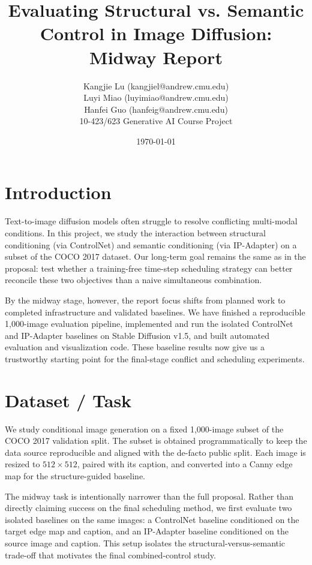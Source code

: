 \documentclass[twocolumn,11pt]{article}
\begin{document}
\title{Evaluating Structural vs. Semantic Control in Image Diffusion: Midway Report}
\author{Kangjie Lu (kangjiel@andrew.cmu.edu) \\
        Luyi Miao (luyimiao@andrew.cmu.edu) \\
        Hanfei Guo (hanfeig@andrew.cmu.edu)\\
10-423/623 Generative AI Course Project}
\date{\today}
\maketitle

\linenumbers

\section{Introduction}
Text-to-image diffusion models often struggle to resolve conflicting multi-modal conditions. In this project, we study the interaction between structural conditioning (via ControlNet) and semantic conditioning (via IP-Adapter) on a subset of the COCO 2017 dataset. Our long-term goal remains the same as in the proposal: test whether a training-free time-step scheduling strategy can better reconcile these two objectives than a naive simultaneous combination.

By the midway stage, however, the report focus shifts from planned work to completed infrastructure and validated baselines. We have finished a reproducible 1{,}000-image evaluation pipeline, implemented and run the isolated ControlNet and IP-Adapter baselines on Stable Diffusion v1.5, and built automated evaluation and visualization code. These baseline results now give us a trustworthy starting point for the final-stage conflict and scheduling experiments.

\section{Dataset / Task}

We study conditional image generation on a fixed 1{,}000-image subset of the COCO 2017 validation split. The subset is obtained programmatically to keep the data source reproducible and aligned with the de-facto public split. Each image is resized to $512 \times 512$, paired with its caption, and converted into a Canny edge map for the structure-guided baseline.

The midway task is intentionally narrower than the full proposal. Rather than directly claiming success on the final scheduling method, we first evaluate two isolated baselines on the same images: a ControlNet baseline conditioned on the target edge map and caption, and an IP-Adapter baseline conditioned on the source image and caption. This setup isolates the structural-versus-semantic trade-off that motivates the final combined-control study.
\end{document}
